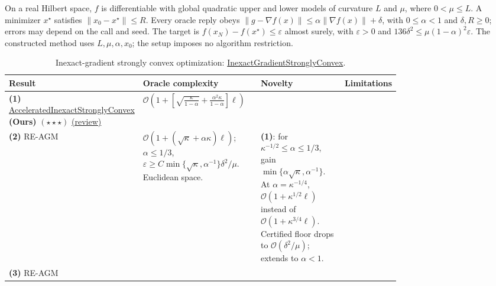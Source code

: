 \begin{table}[tp]
\centering
\caption{Inexact-gradient strongly convex optimization: \href{https://github.com/k3nfalt/longtails/blob/main/LongTails/Setups/InexactGradientStronglyConvex.lean}{InexactGradientStronglyConvex}.}\label{tab:InexactGradientStronglyConvex}
\parbox{\linewidth}{\footnotesize On a real Hilbert space, $f$ is differentiable with global quadratic upper and lower models of curvature $L$ and $\mu$, where $0<\mu\le L$. A minimizer $x^\star$ satisfies $\|x_0-x^\star\|\le R$. Every oracle reply obeys $\|g-\nabla f(x)\|\le\alpha\|\nabla f(x)\|+\delta$, with $0\le\alpha<1$ and $\delta,R\ge0$; errors may depend on the call and seed. The target is $f(x_N)-f(x^\star)\le\varepsilon$ almost surely, with $\varepsilon>0$ and $136\delta^2\le\mu(1-\alpha)^2\varepsilon$. The constructed method uses $L,\mu,\alpha,x_0$; the setup imposes no algorithm restriction.}\par\smallskip
\begin{threeparttable}
\footnotesize
\setlength{\tabcolsep}{4pt}\renewcommand{\arraystretch}{1.25}
\begin{tabularx}{\linewidth}{@{}>{\raggedright\arraybackslash}p{0.20\linewidth}>{\raggedright\arraybackslash}p{0.32\linewidth}>{\raggedright\arraybackslash}p{0.25\linewidth}>{\raggedright\arraybackslash}X@{}}
\toprule
\textbf{Result} & \textbf{Oracle complexity} & \textbf{Novelty} & \textbf{Limitations} \\
\midrule
\textbf{(1)} \href{https://github.com/k3nfalt/longtails/blob/main/LongTails/Theorems/AcceleratedInexactStronglyConvex.lean}{Accelerated\allowbreak Inexact\allowbreak Strongly\allowbreak Convex} \textbf{(Ours)} $(\star\star\star)$ \href{https://github.com/k3nfalt/longtails/blob/main/scripts/reviews/AcceleratedInexactStronglyConvex.md}{(review)}
& $\mathcal{O}\!\left(1+\left[\sqrt{\frac{\kappa}{1-\alpha}}+\frac{\alpha^2\kappa}{1-\alpha}\right]\ell\right)$ & & \\
\midrule[1.2pt]
\textbf{(2)} RE-AGM \citep[Thm.~6.1]{igsVasinGasnikov2026v1}
& $\mathcal{O}\!\left(1+(\sqrt\kappa+\alpha\kappa)\ell\right)$; $\alpha\le1/3$, $\varepsilon\ge C\min\{\sqrt\kappa,\alpha^{-1}\}\delta^2/\mu$. Euclidean space.
& \textbf{(1)}: for $\kappa^{-1/2}\le\alpha\le1/3$, gain $\min\{\alpha\sqrt\kappa,\alpha^{-1}\}$. At $\alpha=\kappa^{-1/4}$, $\mathcal{O}(1+\kappa^{1/2}\ell)$ instead of $\mathcal{O}(1+\kappa^{3/4}\ell)$. Certified floor drops to $\mathcal{O}(\delta^2/\mu)$; extends to $\alpha<1$.
& \\
\midrule
\textbf{(3)} RE-AGM \citep[Thm.~4]{igsVasinEtAl2025v3}

\end{tabularx}
\end{threeparttable}
\end{table}
